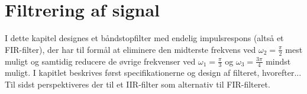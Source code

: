 \chapter{Filtrering af signal}
I dette kapitel designes et båndstopfilter med endelig impulsrespons (altså et FIR-filter), der har til formål at eliminere den midterste frekvens ved $\omega_2 = \frac{\pi}{2}$ mest muligt og samtidig reducere de øvrige frekvenser ved $\omega_1 = \frac{\pi}{3}$ og $\omega_3 = \frac{3\pi}{4}$ mindst muligt. I kapitlet beskrives først specifikationerne og design af filteret, hvorefter... Til sidst perspektiveres der til et IIR-filter som alternativ til FIR-filteret.




